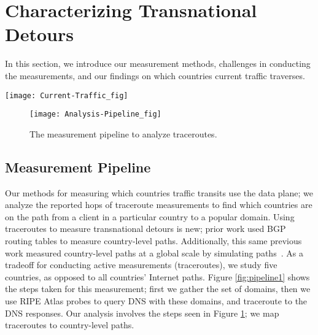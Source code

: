 \section{Characterizing Transnational Detours}
\label{datasets}
In this section, we introduce our measurement methods, challenges in conducting the measurements, and our findings on which countries current traffic traverses.

\begin{figure*}
\centering
\texttt{[image: Current-Traffic\_fig]}
\caption{The measurement pipeline to study current traffic routes.}
\label{fig:pipeline1}
\end{figure*}

\begin{figure}
\centering
\texttt{[image: Analysis-Pipeline\_fig]}
\caption{The measurement pipeline to analyze traceroutes.}
\label{fig:analysis_pipeline}
\end{figure}

\subsection{Measurement Pipeline}
\label{pipeline}
Our methods for measuring which countries traffic transits use the data plane; we analyze the reported hops of traceroute measurements to find which countries are on the path from a client in a particular country to a popular domain.  Using traceroutes to measure transnational detours is new; prior work used BGP routing tables to measure country-level paths.  Additionally, this same previous work measured country-level paths at a global scale by simulating paths~\cite{karlin2009nation}.  As a tradeoff for conducting active measurements (traceroutes), we study five countries, as opposed to all countries' Internet paths.  Figure \ref{fig:pipeline1} shows the steps taken for this measurement; first we gather the set of domains, then we use RIPE Atlas probes to query DNS with these domains, and traceroute to the DNS responses.  Our analysis involves the steps seen in Figure \ref{fig:analysis_pipeline}; we map traceroutes to country-level paths.

